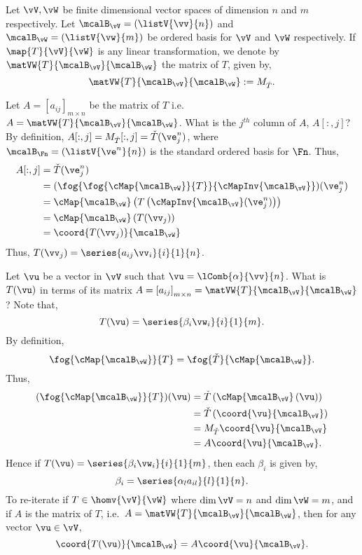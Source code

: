 
\begin{Definition}[name=Matrix]
    Let $\vV,\vW$ be finite dimensional vector spaces of dimension $n$ and $m$ respectively. Let 
    $\mcalB_{\vV} = \left(\listV{\vv}{n}\right)$ and $\mcalB_{\vW} = \left(\listV{\vw}{m}\right)$ 
    be ordered basis for $\vV$ and $\vW$ respectively.
    If $\map{T}{\vV}{\vW}$ is any linear transformation, we denote by $\matVW{T}{\mcalB_{\vV}}{\mcalB_{\vW}}$
    the matrix of $T$, given by,
    \[\matVW{T}{\mcalB_{\vV}}{\mcalB_{\vW}} := M_{\check{T}}.\]
\end{Definition}
Let $A = {[a_{ij}]}_{m\times n}$ be the matrix of $T$ i.e.~$A = \matVW{T}{\mcalB_{\vV}}{\mcalB_{\vW}}$. What
is the $j^{th}$ column of $A$, $A[:,j]$? By definition, $A[:,j] = M_{\check{T}}[:,j] =
\check{T}(\ve^{n}_{j})$, where $\mcalB_{\Fn} = \left(\listV{\ve^{n}}{n}\right)$ is the standard ordered basis
for $\Fn$.
Thus,
\begin{align*}
    A[:,j] &= \check{T}(\ve^{n}_{j})\\
    &= (\fog{\fog{\cMap{\mcalB_{\vW}}}{T}}{\cMapInv{\mcalB_{\vV}}})(\ve^{n}_{j}) \\
    &= \cMap{\mcalB_{\vW}}\left(T\left(\cMapInv{\mcalB_{\vV}}(\ve^{n}_{j})\right)\right)\\
    &= \cMap{\mcalB_{\vW}}\left(T(\vv_{j})\right) \\
    &= \coord{T(\vv_{j})}{\mcalB_{\vW}}
\end{align*}
Thus, $T(\vv_{j}) = \series{a_{ij}\vv_{i}}{i}{1}{n}$.

Let $\vu$ be a vector in $\vV$ such that $\vu = \lComb{\alpha}{\vv}{n}$. 
What is $T(\vu)$ in terms of its matrix 
$A = {[a_{ij}]}_{m\times n} = \matVW{T}{\mcalB_{\vV}}{\mcalB_{\vW}}$? Note that,
\[T(\vu) = \series{\beta_{i}\vw_{i}}{i}{1}{m}.\]
By definition,
\[\fog{\cMap{\mcalB_{\vW}}}{T} = \fog{\check{T}}{\cMap{\mcalB_{\vW}}}.\]
Thus,
\begin{align*}
    (\fog{\cMap{\mcalB_{\vW}}}{T})(\vu) & = \check{T}\left(\cMap{\mcalB_{\vV}}\left(\vu\right)\right)\\
    & = \check{T}\left(\coord{\vu}{\mcalB_{\vV}}\right)\\
    & = M_{\check{T}}\coord{\vu}{\mcalB_{\vV}}\\
    & = A\coord{\vu}{\mcalB_{\vV}}.
\end{align*}
Hence if $T(\vu) = \series{\beta_{i}\vw_{i}}{i}{1}{m}$, then each $\beta_{i}$ is given by,
\[\beta_i = \series{\alpha_{l}a_{il}}{l}{1}{n}.\]
To re-iterate if $T\in \homv{\vV}{\vW}$ where $\dim{\vV} = n$ and $\dim{\vW} = m$, and if $A$ is the matrix of
$T$, i.e.~$A = \matVW{T}{\mcalB_{\vV}}{\mcalB_{\vW}}$, then for any vector $\vu \in \vV$,
\[\coord{T(\vu)}{\mcalB_{\vW}} = A\coord{\vu}{\mcalB_{\vV}}.\]

